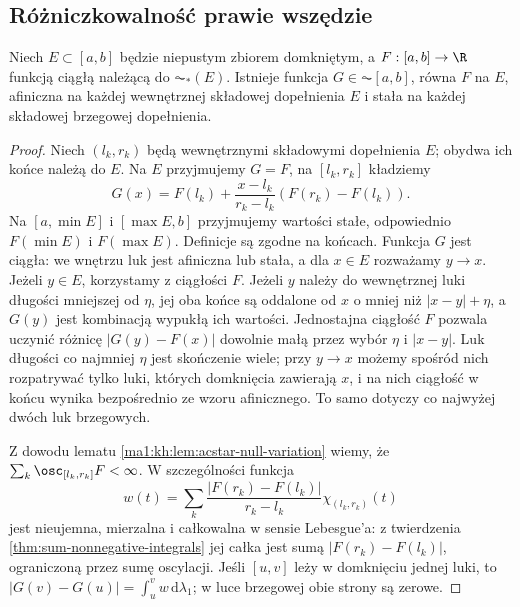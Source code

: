 \subsection{Różniczkowalność prawie wszędzie}
\begin{lemat}
\label{ma1:kh:lem:acstar-affine-extension}\label{it:lem:acstar-affine-extension}
Niech $E\subset[a,b]$ będzie niepustym zbiorem domkniętym, a $F:[a,b]\to\R$ funkcją ciągłą należącą do $\AC_*(E)$. Istnieje funkcja $G\in\AC[a,b]$, równa $F$ na $E$, afiniczna na każdej wewnętrznej składowej dopełnienia $E$ i stała na każdej składowej brzegowej dopełnienia.
\end{lemat}
\begin{proof}
Niech $(l_k,r_k)$ będą wewnętrznymi składowymi dopełnienia $E$; obydwa ich końce należą do $E$. Na $E$ przyjmujemy $G=F$, na $[l_k,r_k]$ kładziemy
\[
 G(x)=F(l_k)+\frac{x-l_k}{r_k-l_k}(F(r_k)-F(l_k)).
\]
Na $[a,\min E]$ i $[\max E,b]$ przyjmujemy wartości stałe, odpowiednio $F(\min E)$ i $F(\max E)$. Definicje są zgodne na końcach. Funkcja $G$ jest ciągła: we wnętrzu luk jest afiniczna lub stała, a dla $x\in E$ rozważamy $y\to x$. Jeżeli $y\in E$, korzystamy z ciągłości $F$. Jeżeli $y$ należy do wewnętrznej luki długości mniejszej od $\eta$, jej oba końce są oddalone od $x$ o mniej niż $|x-y|+\eta$, a $G(y)$ jest kombinacją wypukłą ich wartości. Jednostajna ciągłość $F$ pozwala uczynić różnicę $|G(y)-F(x)|$ dowolnie małą przez wybór $\eta$ i $|x-y|$. Luk długości co najmniej $\eta$ jest skończenie wiele; przy $y\to x$ możemy spośród nich rozpatrywać tylko luki, których domknięcia zawierają $x$, i na nich ciągłość w końcu wynika bezpośrednio ze wzoru afinicznego. To samo dotyczy co najwyżej dwóch luk brzegowych.

Z dowodu lematu \ref{ma1:kh:lem:acstar-null-variation} wiemy, że $\sum_k\osc_{[l_k,r_k]}F<\infty$. W szczególności funkcja
\[
 w(t)=\sum_k\frac{|F(r_k)-F(l_k)|}{r_k-l_k}
             \chi_{(l_k,r_k)}(t)
\]
jest nieujemna, mierzalna i całkowalna w sensie Lebesgue'a: z twierdzenia \ref{thm:sum-nonnegative-integrals} jej całka jest sumą $|F(r_k)-F(l_k)|$, ograniczoną przez sumę oscylacji. Jeśli $[u,v]$ leży w domknięciu jednej luki, to $|G(v)-G(u)|=\int_u^v w\,\mathrm d\lambda_1$; w luce brzegowej obie strony są zerowe.


\end{proof}
